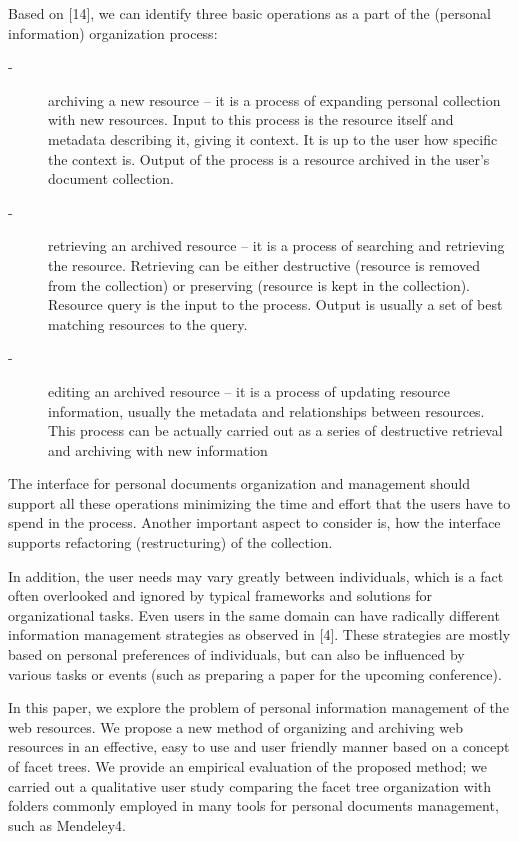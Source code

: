 \documentclass{article}
\begin{document}
Based on [14], we can identify three basic operations as a part of the (personal information) organization process: 
 
 \begin{description}
 
 \item[-]archiving a new resource – it is a process of expanding personal collection with new resources. Input to this process is the resource itself and metadata describing it, giving it context. It is up to the user how specific the context is. Output of the process is a resource archived in the user’s document collection.
 \item[-] retrieving an archived resource – it is a process of searching and retrieving the resource. Retrieving can be either destructive (resource is removed from the collection) or preserving (resource is kept in the collection). Resource query is the input to the process. Output is usually a set of best matching resources to the query.
 \item[-]editing an archived resource – it is a process of updating resource information, usually the metadata and relationships between resources. This process can be actually carried out as a series of destructive retrieval and archiving with new information
 \end{description}
 
The interface for personal documents organization and management should support all these operations minimizing the time and effort that the users have to spend in the process. Another important aspect to consider is, how the interface supports refactoring (restructuring) of the collection. 

In addition, the user needs may vary greatly between individuals, which is a fact often overlooked and ignored by typical frameworks and solutions for organizational tasks. Even users in the same domain can have radically different information management strategies as observed in [4]. These strategies are mostly based on personal preferences of individuals, but can also be influenced by various tasks or events (such as preparing a paper for the upcoming conference). 

In this paper, we explore the problem of personal information management of the web resources. We propose a new method of organizing and archiving web resources in an effective, easy to use and user friendly manner based on a concept of facet trees. We provide an empirical evaluation of the proposed method; we carried out a qualitative user study comparing the facet tree organization with folders commonly employed in many tools for personal documents management, such as Mendeley4. 
\end{document}
